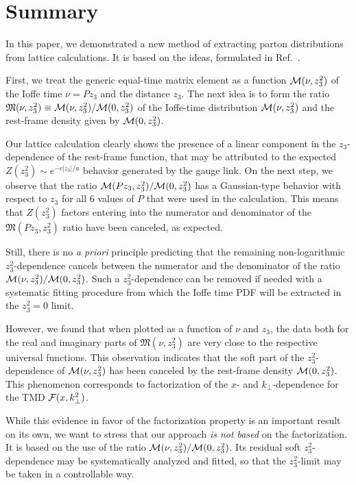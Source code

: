\section{Summary}

In this paper, we demonstrated   a new method of extracting
 parton distributions from lattice calculations.
  It is  based on the  ideas, formulated in \mbox{Ref. \cite{Radyushkin:2017cyf}.}

 First, we   treat the generic equal-time  matrix element as a function ${\cal M} (\nu, z_3^2)$
 of the Ioffe time $\nu = Pz_3$ and the distance $z_3$. The
 next idea is to  form the ratio ${\mathfrak  M} (\nu, z_3^2) \equiv {\cal M} (\nu, z_3^2)/{\cal M} (0, z_3^2)$
 of the Ioffe-time distribution ${\cal M} (\nu, z_3^2)$ and the rest-frame density given by
  ${\cal M} (0, z_3^2)$.

Our lattice calculation clearly shows the presence of a linear  component in the $z_3$-dependence
 of  the rest-frame function, that may be attributed to the expected $Z(z_3^2) \sim e^{-c|z_3|/a}$ behavior
 generated by the gauge link.
 On the next step, we observe that  the ratio ${\cal M} (Pz_3 , z_3^2)/{\cal M} (0, z_3^2)$
 has a Gaussian-type  behavior with respect to $z_3$ for all 6
 values of $P$ that were used in the calculation.
 This means that $Z(z_3^2)$ factors entering into the numerator and denominator
 of the ${\mathfrak  M} (Pz_3, z_3^2)$  ratio have been canceled, as expected.

 Still, there is no {\it a priori} principle predicting that  the  remaining
 non-logarithmic  $z_3^2$-dependence cancels
 between  the numerator and the denominator of the ratio ${\cal M} (\nu, z_3^2)/{\cal M} (0, z_3^2)$.
 Such a   $z_3^2$-dependence can be removed if needed with a systematic fitting procedure
 from which the Ioffe time PDF will be  extracted in the $z_3^2=0$ limit.

 However, we found  that when plotted as a function of $\nu$ and $z_3$, the data both
 for the real and imaginary parts of ${\mathfrak  M} (\nu, z_3^2)$  are very close
 to  the respective universal functions. This observation indicates  that
 the soft part of the \mbox{$z_3^2$-dependence}  of $   {\cal M} (\nu, z_3^2)$
 has been  canceled by the rest-frame density $   {\cal M} (0, z_3^2)$.
 This phenomenon corresponds to factorization of the $x$- and $k_\perp$-dependence
 for the  TMD ${\cal F} (x, k_\perp^2)$.

 While this evidence in favor of the factorization property is an important result on its own,
 we want to stress  that our approach  {\it is not based}
 on the factorization.  It is based on the use of the ratio
 ${\cal M} (\nu, z_3^2)/{\cal M} (0, z_3^2)$. Its   residual soft $z_3^2$-dependence
 may be systematically analyzed and fitted, so that the $z_3^2$-limit
 may be taken in a controllable way.


